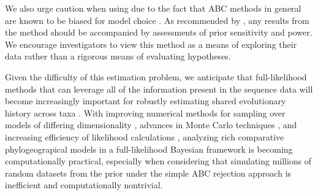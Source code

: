 We also urge caution when using \dppmsbayes due to the fact that ABC methods
in general are known to be biased for model choice \citep{Robert2011}.
As recommended by \citet{Oaks2012}, any results from the method should be
accompanied by assessments of prior sensitivity and power.
We encourage investigators to view this method as a means of exploring their
data rather than a rigorous means of evaluating hypotheses.

Given the difficulty of this estimation problem, we anticipate that
full-likelihood methods that can leverage all of the information present in the
sequence data will become increasingly important for robustly estimating shared
evolutionary history across taxa \citep{JeetDiss}.
With improving numerical methods for sampling over models of differing
dimensionality \citep{Green1995,Lemey2009}, advances in Monte Carlo techniques
\citep{Jordan2012}, and increasing efficiency of likelihood calculations
\citep{Ayres2012}, analyzing rich comparative phylogeograpical models in a
full-likelihood Bayesian framework is becoming computationally practical,
especially when considering that simulating millions of random datasets from
the prior under the simple ABC rejection approach is inefficient and
computationally nontrivial.

